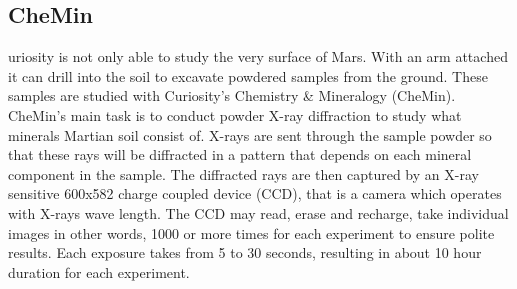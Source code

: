 \subsection{CheMin}
uriosity is not only able to study the very surface of Mars.
With an arm attached it can drill into the soil to excavate powdered samples from the ground.
These samples are studied with Curiosity's Chemistry \& Mineralogy (CheMin).
CheMin's main task is to conduct powder X-ray diffraction to study what minerals Martian soil consist of.
X-rays are sent through the sample powder so that these rays will be diffracted in a pattern that depends on each mineral component in the sample.
The diffracted rays are then captured by an X-ray sensitive 600x582 charge coupled device (CCD), that is a camera which operates with X-rays wave length.
The CCD may read, erase and recharge, take individual images in other words, 1000 or more times for each experiment to ensure polite results.
Each exposure takes from 5 to 30 seconds, resulting in about 10 hour duration for each experiment. \cite{CheMin}